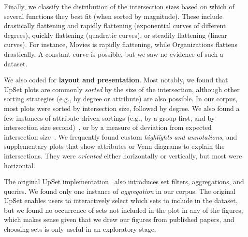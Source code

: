 \documentclass{egpubl}
\newcommand{\eg}{{e.g.,}}
\begin{document}
\begin{description}[noitemsep, topsep=0pt]
    \item[Intersection Size Distribution]
          Finally, we classify the distribution of the intersection sizes based on which of several functions they best fit (when sorted by magnitude).
          These include drastically flattening and rapidly flattening (exponential curves of different degrees), quickly flattening (quadratic curves), or steadily flattening (linear curves).
          For instance, Movies is rapidly flattening, while Organizations flattens drastically.
          A constant curve is possible, but we saw no evidence of such a dataset.
\end{description}


We also coded for \textbf{layout and presentation}.
Most notably, we found that UpSet plots are commonly \textit{sorted} by the size of the intersection, although other sorting strategies (\eg{} by degree or attribute) are also possible.
In our corpus, most plots were sorted by intersection size, followed by degree.
We also found a few instances of attribute-driven sortings (\eg{} by a group first, and by intersection size second)~\cite{friedman_xylazine_2022}, or by a measure of deviation from expected intersection size~\cite{lu_comparative_2022}.
We frequently found custom \textit{highlights and annotations}, and supplementary plots that show attributes or Venn diagrams to explain the intersections.
They were \textit{oriented} either horizontally or vertically, but most were horizontal.

The original UpSet implementation~\cite{lex_upset_2014} also introduces set filters, aggregations, and queries. We found only one instance of \textit{aggregation} in our corpus. The original UpSet enables users to interactively select which sets to include in the dataset, but we found no occurrence of sets not included in the plot in any of the figures, which makes sense given that we drew our figures from published papers, and choosing sets is only useful in an exploratory stage.
\end{document}
